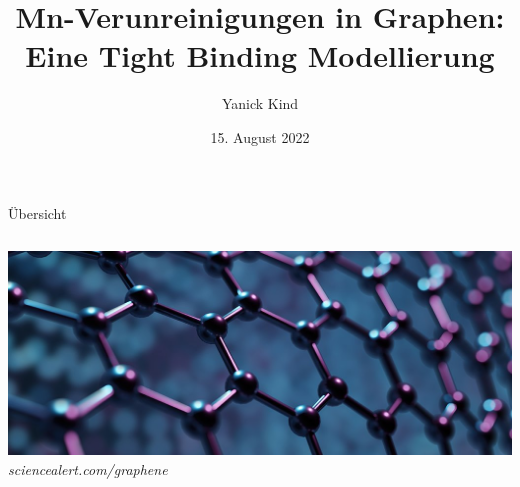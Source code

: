\documentclass[aspectratio=1610, 9pt, xcolor=dvipsnames]{beamer}
\title{Mn-Verunreinigungen in Graphen: Eine
Tight Binding Modellierung}
\author[Y.~Kind]{Yanick Kind}
\institute[AG Anders]{AG Anders \\  Fakultät Physik}
\date{15. August 2022}
\begin{document}
\maketitle

\begin{frame}{Übersicht}
  \begin{columns}
    \setlength{\parskip}{4ex}
    \tableofcontents
    \vspace*{1cm}
    \centering
    \includegraphics[width = \textwidth]{Plots/rendering.jpg}
    \hspace*{12pt}\hbox{\scriptsize {\footnotesize\itshape sciencealert.com/graphene }}
  \end{columns}
\end{frame}
\end{document}
